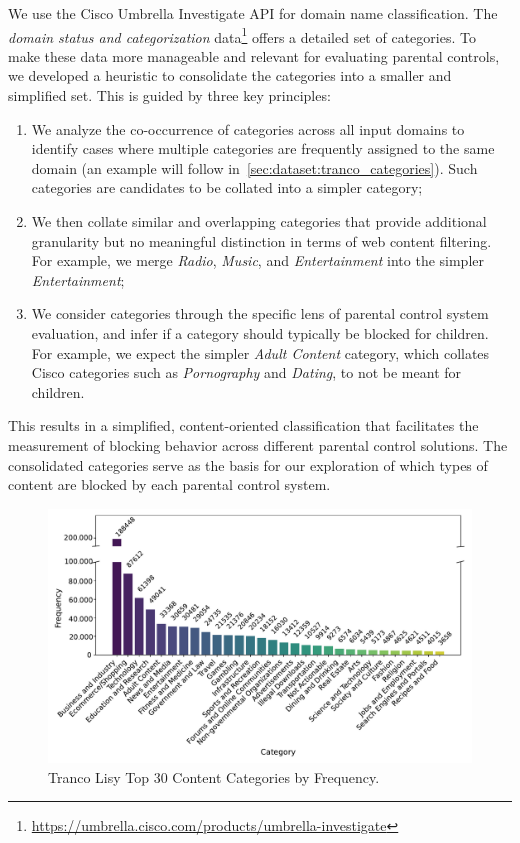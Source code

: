 We use the Cisco Umbrella Investigate API for domain name classification.
The \emph{domain status and categorization} data\footnote{\url{https://umbrella.cisco.com/products/umbrella-investigate}}
offers a detailed set of categories. To make these data more manageable and
relevant for evaluating parental controls, we developed a heuristic to
consolidate the categories into a smaller and simplified set. This
is guided by three key principles:

\begin{enumerate}
    \item We analyze the co-occurrence of categories across all input domains
        to identify cases where multiple categories are frequently assigned to
        the same domain (an example will follow in~\cref{sec:dataset:tranco_categories}).
        Such categories are candidates to be collated into a simpler category;
    \item We then collate similar and overlapping categories that provide additional
        granularity but no meaningful distinction in terms of web content
        filtering. For example, we merge \emph{Radio}, \emph{Music}, and
        \emph{Entertainment} into the simpler \emph{Entertainment};
    \item We consider categories through the specific lens of parental
        control system evaluation, and infer if a category should
        typically be blocked for children. For example, we expect the simpler \emph{Adult Content} category, which 
        collates Cisco categories such as \emph{Pornography} and \emph{Dating}, to not be meant for children.
\end{enumerate}

This results in a simplified, content-oriented classification that facilitates
the measurement of blocking behavior across different parental control
solutions.  The consolidated categories serve as the basis for our
exploration of which types of content are blocked by each parental control system.

\begin{figure}[!tb]
    \centering
    \includegraphics[width=1\columnwidth]{Images/top_30_categories.pdf}
    \caption{Tranco Lisy Top 30 Content Categories by Frequency.}
    \label{fig:top30categories}
\end{figure}

